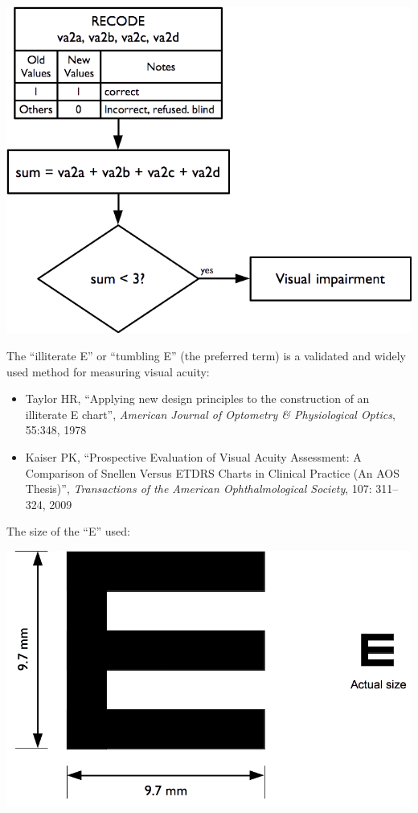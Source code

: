 \documentclass[12pt,a4paper]{book}
\theoremstyle{definition}
\theoremstyle{definition}
\theoremstyle{definition}
\theoremstyle{remark}
\begin{document}
\begin{center}\includegraphics{figures/indicators27} \end{center}

The ``illiterate E'' or ``tumbling E'' (the preferred term) is a
validated and widely used method for measuring visual acuity:

\begin{itemize}
\item
  Taylor HR, ``Applying new design principles to the construction of an
  illiterate E chart'', \emph{American Journal of Optometry \&
  Physiological Optics}, 55:348, 1978
\item
  Kaiser PK, ``Prospective Evaluation of Visual Acuity Assessment: A
  Comparison of Snellen Versus ETDRS Charts in Clinical Practice (An AOS
  Thesis)'', \emph{Transactions of the American Ophthalmological
  Society}, 107: 311--324, 2009
\end{itemize}

\newpage

The size of the ``E'' used:

\begin{center}\includegraphics{figures/indicators28} \end{center}
\end{document}
